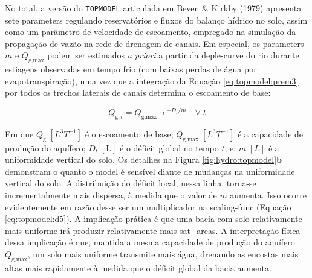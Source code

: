 \documentclass[./main.tex]{subfiles}
\begin{document}
\par No total, a versão do \texttt{TOPMODEL} articulada em Beven \& Kirkby (1979) apresenta sete \gls{parameters} regulando reservatórios e fluxos do balanço hídrico no solo, assim como um parâmetro de velocidade de escoamento, empregado na simulação da propagação de vazão na rede de drenagem de canais. Em especial, os \gls{parameters} $m$ e $Q_{\text{g},\text{max}}$ podem ser estimados \textit{a priori} a partir da \gls{deple-curve} do rio durante estiagens observadas em tempo frio (com baixas perdas de água por evapotranspiração), uma vez que a integração da Equação \eqref{eq:topmodel:prem3} por todos os trechos laterais de canais determina o escoamento de base:
\begin{linenomath*}
\begin{equation}
\label{eq:topmodel:prem3a}
Q_{\text{g}, t} = Q_{\text{g},\text{max}} \cdot e^{-D_{t}/m}  \quad \forall \; t
\end{equation}
\end{linenomath*}
Em que $Q_{\text{g}}\;[L^{3}T^{-1}]$ é o escoamento de base; $Q_{\text{g},\text{max}}\;[L^{3}T^{-1}]$ é a capacidade de produção do aquífero; $D_t\;[\text{L}]$ é o déficit global no tempo $t$, e; $m\; [L]$ é a uniformidade vertical do solo. Os detalhes na Figura \ref{fig:hydro:topmodel}\textbf{b} demonstram o quanto o \gls{model} é sensível diante de mudanças na uniformidade vertical do solo. A distribuição do déficit local, nessa linha, torna-se incrementalmente mais dispersa, à medida que o valor de $m$ aumenta. Isso ocorre evidentemente em razão desse ser um multiplicador na \gls{scaling-func} (Equação \eqref{eq:topmodel:d5}). A implicação prática é que uma bacia com solo relativamente mais uniforme irá produzir relativamente mais \gls{sat_areas}. A interpretação física dessa implicação é que, mantida a mesma capacidade de produção do aquífero $Q_{\text{g},\text{max}}$, um solo mais uniforme transmite mais água, drenando as encostas mais altas mais rapidamente à medida que o déficit global da bacia aumenta. 
\end{document}

